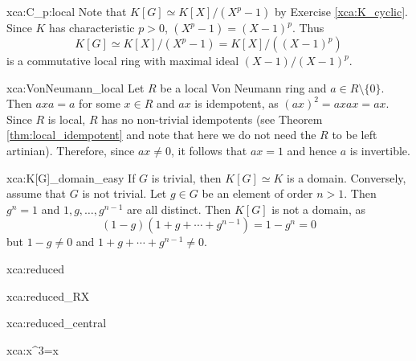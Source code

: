 \begin{sol}{xca:C_p:local}
    Note that $K[G]\simeq K[X]/(X^p-1)$ by 
    Exercise \ref{xca:K_cyclic}. Since $K$ has characteristic $p>0$, 
    $(X^p-1)=(X-1)^p$. Thus 
    \[
    K[G]\simeq K[X]/(X^p-1)=K[X]/( (X-1)^p)
    \]
    is a commutative local ring with maximal ideal $(X-1)/(X-1)^p$. 
\end{sol}

\begin{sol}{xca:VonNeumann_local}
    Let $R$ be a local Von Neumann ring and $a\in R\setminus\{0\}$. Then $axa=a$ for some $x\in R$ and 
    $ax$ is idempotent, as $(ax)^2=axax=ax$. Since $R$ is local, $R$ has no non-trivial idempotents (see Theorem \ref{thm:local_idempotent} and note that here we do not need the $R$ to be left artinian). Therefore, since 
    $ax\ne 0$, it follows that $ax=1$ and hence $a$ is invertible. 
\end{sol}

\begin{sol}{xca:K[G]_domain_easy}
    If $G$ is trivial, then $K[G]\simeq K$ is a domain. Conversely, 
    assume that $G$ is not trivial. Let $g\in G$ be an element of
    order $n>1$. Then $g^n=1$ and 
    $1,g,\dots,g^{n-1}$ are all distinct. Then $K[G]$ is not a domain, as 
  \[
  (1-g)(1+g+\cdots+g^{n-1})=1-g^n=0
  \]   
  but $1-g\ne 0$ and $1+g+\cdots+g^{n-1}\ne 0$. 
\end{sol}



\begin{sol}{xca:reduced}

\end{sol}

\begin{sol}{xca:reduced_RX}

\end{sol}

\begin{sol}{xca:reduced_central}
\end{sol}

\begin{sol}{xca:x^3=x}
\end{sol}


